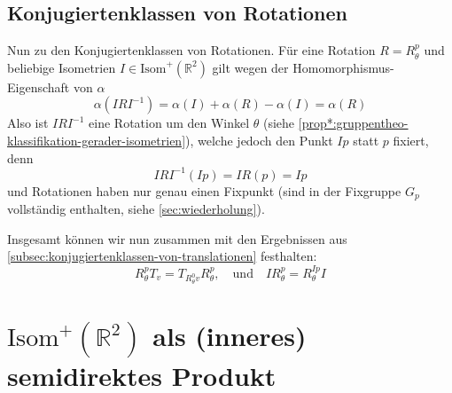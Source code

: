 \documentclass[a4paper, ngerman]{article}
\numberwithin{equation}{chapter}
\theoremstyle{plain}
\theoremstyle{definition}
\newcommand{\geradisometr}{\ensuremath{\mathrm{Isom}^+(\mathbb R^2)}}
\begin{document}
\subsection{Konjugiertenklassen von Rotationen}\label{subsec:konjugiertenklassen-von-rotationen}
Nun zu den Konjugiertenklassen von Rotationen. Für eine Rotation \(R = R_\theta^p\) und beliebige Isometrien \(I \in \geradisometr\) gilt wegen der Homomorphismus-Eigenschaft von \(\alpha\) 
\begin{equation*}
    \alpha(IRI^{-1}) = \alpha(I) + \alpha(R) - \alpha(I) = \alpha(R)
\end{equation*}
Also ist \(IRI^{-1}\) eine Rotation um den Winkel \(\theta\) (siehe \cref{prop*:gruppentheo-klassifikation-gerader-isometrien}), welche jedoch den Punkt \(Ip\) statt \(p\) fixiert, denn
\begin{equation*}
    IRI^{-1}(Ip) = IR(p) = Ip
\end{equation*}
und Rotationen haben nur genau einen Fixpunkt (sind in der Fixgruppe \(G_p\) vollständig enthalten, siehe \cref{sec:wiederholung}). 

Insgesamt können wir nun zusammen mit den Ergebnissen aus \cref{subsec:konjugiertenklassen-von-translationen} festhalten:
\begin{equation}\label{eq:konjugations-relationen}
    R_\theta^p T_v = T_{R_\theta^0 v} R_\theta^p, \quad \text{und} \quad IR_\theta^p = R_\theta^{Ip}I
\end{equation}

\section{\(\geradisometr\) als (inneres) semidirektes Produkt}
\end{document}
